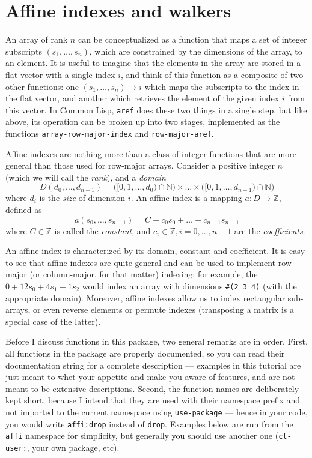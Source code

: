 \documentclass[letterpaper,11pt]{article}
\begin{document}
\section{Affine indexes and walkers}
\label{sec:affine-indexes}

An array of rank $n$ can be conceptualized as a function that maps a
set of integer subscripts $(s_1,\dots,s_n)$, which are constrained by
the dimensions of the array, to an element.  It is useful to imagine
that the elements in the array are stored in a flat vector with a
single index $i$, and think of this function as a composite of two
other functions: one $(s_1,\dots,s_n)\mapsto i$ which maps the
subscripts to the index in the flat vector, and another which
retrieves the element of the given index $i$ from this vector.  In
Common Lisp, \lstinline!aref! does these two things in a single step,
but like above, its operation can be broken up into two stages,
implemented as the functions \lstinline!array-row-major-index! and
\lstinline!row-major-aref!.

Affine indexes are nothing more than a class of integer functions that
are more general than those used for row-major arrays.  Consider a
positive integer $n$ (which we will call the \emph{rank}), and a
\emph{domain}
\begin{equation*}
  D(d_0,\dots,d_{n-1}) = \bigl([0,1,\dots,d_0)\cap \mathbb{N}\bigr)
  \times \dots \times \bigl([0,1,\dots,d_{n-1})\cap \mathbb{N}\bigr)
\end{equation*}
where $d_i$ is the \emph{size} of dimension $i$.  An affine index is a
mapping $a: D \to \mathbb{Z}$, defined as
\begin{equation*}
  a(s_0,\dots, s_{n-1}) = C + c_0s_0 + \dots + c_{n-1}s_{n-1}
\end{equation*}
where $C\in\mathbb{Z}$ is called the \emph{constant}, and
$c_i\in\mathbb{Z}, i=0,\dots,n-1$ are the \emph{coefficients}.

An affine index is characterized by its domain, constant and
coefficient.  It is easy to see that affine indexes are quite general and
can be used to implement row-major (or column-major, for that matter)
indexing: for example, the $0+12s_0+4s_1+1s_2$ would index an array
with dimensions \lstinline!#(2 3 4)! (with the appropriate domain).
Moreover, affine indexes allow us to index rectangular sub-arrays, or
even reverse elements or permute indexes (transposing a matrix is a
special case of the latter).

Before I discuss functions in this package, two general remarks are in
order.  First, all functions in the package are properly documented,
so you can read their documentation string for a complete description
--- examples in this tutorial are just meant to whet your appetite and
make you aware of features, and are not meant to be extensive
descriptions.  Second, the function names are deliberately kept short,
because I intend that they are used with their namespace prefix and
not imported to the current namespace using \lstinline!use-package!
--- hence in your code, you would write \lstinline!affi:drop! instead
of \lstinline!drop!.  Examples below are run from the \lstinline!affi!
namespace for simplicity, but generally you should use another one
(\lstinline!cl-user:!, your own package, etc).
\end{document}
